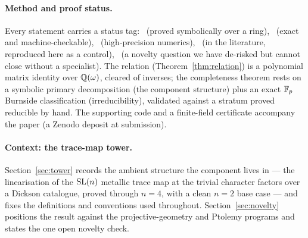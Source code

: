 \paragraph{\textmd{\textbf{Method and proof status.}}} Every statement carries a status tag:
\sExact\ (proved symbolically over a ring), \sProved\ (exact and machine-checkable), \sNum\
(high-precision numerics), \sKnown\ (in the literature, reproduced here as a control), \sGated\ (a
novelty question we have de-risked but cannot close without a specialist). The relation
(Theorem~\ref{thm:relation}) is a polynomial matrix identity over $\mathbb{Q}(\omega)$, cleared of inverses; the
completeness theorem rests on a symbolic primary decomposition (the component structure) plus an exact
$\mathbb{F}_p$ Burnside classification (irreducibility), validated against a stratum proved reducible by hand. The
supporting code and a finite-field certificate accompany the paper (a Zenodo deposit at submission).

\paragraph{\textmd{\textbf{Context: the trace-map tower.}}} Section~\ref{sec:tower} records the ambient
structure the component lives in --- the linearisation of the $\mathrm{SL}(n)$ metallic trace map at the trivial
character factors over a Dickson catalogue, proved through $n=4$, with a clean $n=2$ base case --- and
fixes the definitions and conventions used throughout. Section~\ref{sec:novelty} positions the result
against the projective-geometry and Ptolemy programs and states the one open novelty check.

